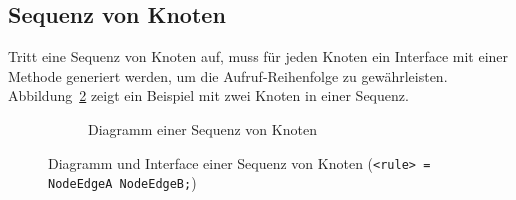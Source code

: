 \documentclass[../InterneDSLs.tex]{subfiles}
\begin{document}
\subsection{Sequenz von Knoten}\label{SEC:Sequence}
Tritt eine Sequenz von Knoten auf, muss für jeden Knoten ein Interface mit einer Methode generiert werden, um die Aufruf-Reihenfolge zu gewährleisten. Abbildung~\ref{FIG:SequenceNode} zeigt ein Beispiel mit zwei Knoten in einer Sequenz.
\begin{figure}[ht]
\centering
  \begin{subfigure}[c]{0.49\textwidth}
    \caption{Diagramm einer Sequenz von Knoten}
    \label{FIG:DiagramSequenceNode}
  \end{subfigure}
  \begin{subfigure}[c]{0.49\textwidth}
    
  \end{subfigure}
  \caption{Diagramm und Interface einer Sequenz von Knoten (\texttt{<rule> = NodeEdgeA NodeEdgeB;})}
  \label{FIG:SequenceNode}
\end{figure}
\end{document}
